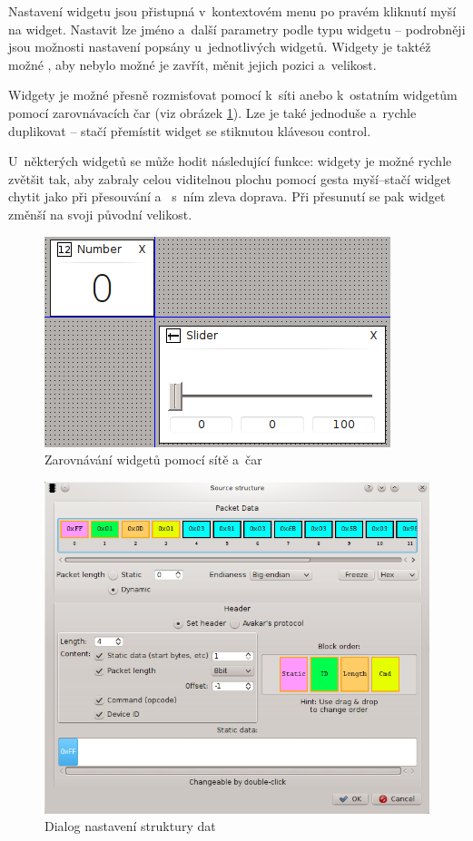 \documentclass[12pt, a4paper, oneside]{article}
\begin{document}
Nastavení widgetu jsou přistupná v~kontextovém menu po pravém kliknutí myší na widget. Nastavit lze jméno a~další parametry podle typu widgetu -- podrobněji jsou možnosti nastavení popsány u~jednotlivých widgetů. Widgety je taktéž možné , aby nebylo možné je zavřít, měnit jejich pozici a~velikost.

Widgety je možné přesně rozmisťovat pomocí  k~síti anebo k~ostatním widgetům pomocí zarovnávacích čar (viz obrázek \ref{widget_lines}). Lze je také jednoduše a~rychle duplikovat -- stačí přemístit widget se stiknutou klávesou control.

U~některých widgetů se může hodit následující funkce: widgety je možné rychle zvětšit tak, aby zabraly celou viditelnou plochu pomocí gesta myší--stačí widget chytit jako při přesouvání a~ s~ním zleva doprava. Při přesunutí se pak widget změnší na svoji původní velikost.

\begin{figure}[H]
\begin{center}
\includegraphics[scale=1]{img/lines.png}
\caption{Zarovnávání widgetů pomocí sítě a~čar}
\label{widget_lines}
\end{center}
\end{figure}

\begin{figure}[H]
\begin{center}
\includegraphics[scale=0.65]{img/analyzer_struct.png}
\caption{Dialog nastavení struktury dat}
\label{Analyzer_struct}
\end{center}
\end{figure}
\end{document}
